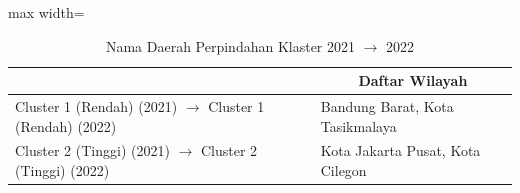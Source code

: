 \begin{table}[H]
\centering
\caption{Nama Daerah Perpindahan Klaster 2021 \(\rightarrow\) 2022} \label{tab:sample2transname2021x2022}
\begin{adjustbox}{max width=\textwidth}
\begin{tabular}{|>{\centering\arraybackslash}p{4cm}|p{10cm}|}
\hline
\multicolumn{1}{|c|}{\textbf{Kategori}} & \multicolumn{1}{c|}{\textbf{Daftar Wilayah}} \\
\hline
Cluster 1 (Rendah) (2021) \(\rightarrow\) Cluster 1 (Rendah) (2022) & Bandung Barat, Kota Tasikmalaya \\
\hline
Cluster 2 (Tinggi) (2021) \(\rightarrow\) Cluster 2 (Tinggi) (2022) & Kota Jakarta Pusat, Kota Cilegon \\
\hline
\end{tabular}
\end{adjustbox}
\end{table}